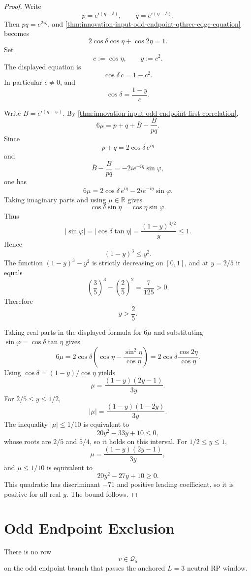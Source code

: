 \begin{proof}
Write
$$
p=e^{i(\eta+\delta)},
\qquad
q=e^{i(\eta-\delta)}.
$$
Then $pq=e^{2i\eta}$, and
\autoref{thm:innovation-input-odd-endpoint-qthree-edge-equation} becomes
$$
2\cos\delta\cos\eta+\cos2\eta=1.
$$
Set
$$
c:=\cos\eta,
\qquad
y:=c^2.
$$
The displayed equation is
$$
\cos\delta\,c=1-c^2.
$$
In particular $c\ne0$, and
$$
\cos\delta=\frac{1-y}{c}.
$$

Write $B=e^{i(\eta+\varphi)}$. By
\autoref{thm:innovation-input-odd-endpoint-first-correlation},
$$
6\mu=p+q+\overline B-\frac{B}{pq}.
$$
Since
$$
p+q=2\cos\delta\,e^{i\eta}
$$
and
$$
\overline B-\frac{B}{pq}
=
-2i e^{-i\eta}\sin\varphi,
$$
one has
$$
6\mu
=
2\cos\delta\,e^{i\eta}
-2i e^{-i\eta}\sin\varphi.
$$
Taking imaginary parts and using $\mu\in\mathbb R$ gives
$$
\cos\delta\sin\eta=\cos\eta\sin\varphi.
$$
Thus
$$
|\sin\varphi|
=
|\cos\delta\tan\eta|
=
\frac{(1-y)^{3/2}}{y}
\le1.
$$
Hence
$$
(1-y)^3\le y^2.
$$
The function $(1-y)^3-y^2$ is strictly decreasing on $[0,1]$, and at
$y=2/5$ it equals
$$
\left(\frac35\right)^3-\left(\frac25\right)^2
=
\frac7{125}>0.
$$
Therefore
$$
y>\frac25.
$$

Taking real parts in the displayed formula for $6\mu$ and substituting
$\sin\varphi=\cos\delta\tan\eta$ gives
$$
6\mu
=
2\cos\delta
\left(
\cos\eta-\frac{\sin^2\eta}{\cos\eta}
\right)
=
2\cos\delta\frac{\cos2\eta}{\cos\eta}.
$$
Using $\cos\delta=(1-y)/\cos\eta$ yields
$$
\mu
=
\frac{(1-y)(2y-1)}{3y}.
$$
For $2/5\le y\le1/2$,
$$
|\mu|
=
\frac{(1-y)(1-2y)}{3y}.
$$
The inequality $|\mu|\le1/10$ is equivalent to
$$
20y^2-33y+10\le0,
$$
whose roots are $2/5$ and $5/4$, so it holds on this interval. For
$1/2\le y\le1$,
$$
\mu=\frac{(1-y)(2y-1)}{3y},
$$
and $\mu\le1/10$ is equivalent to
$$
20y^2-27y+10\ge0.
$$
This quadratic has discriminant $-71$ and positive leading coefficient,
so it is positive for all real $y$. The bound follows.
\end{proof}

\section{Odd Endpoint Exclusion}
\label{sec:innovation-input-odd-endpoint-exclusion}

\begin{theorem}[No odd endpoint anchored $L=3$ candidate]
\label{thm:innovation-input-no-odd-endpoint-lthree-candidate}
There is no row
$$
v\in\mathcal Q_5
$$
on the odd endpoint branch that passes the anchored $L=3$ neutral RP
window.
\end{theorem}


